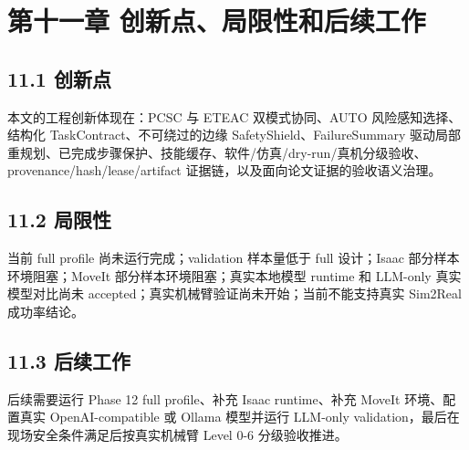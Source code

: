 \chapter{第十一章 创新点、局限性和后续工作}

\section{11.1 创新点}

本文的工程创新体现在：PCSC 与 ETEAC 双模式协同、AUTO 风险感知选择、结构化 TaskContract、不可绕过的边缘 SafetyShield、FailureSummary 驱动局部重规划、已完成步骤保护、技能缓存、软件/仿真/dry-run/真机分级验收、provenance/hash/lease/artifact 证据链，以及面向论文证据的验收语义治理。\par

\section{11.2 局限性}

当前 full profile 尚未运行完成；validation 样本量低于 full 设计；Isaac 部分样本环境阻塞；MoveIt 部分样本环境阻塞；真实本地模型 runtime 和 LLM-only 真实模型对比尚未 accepted；真实机械臂验证尚未开始；当前不能支持真实 Sim2Real 成功率结论。\par

\section{11.3 后续工作}

后续需要运行 Phase 12 full profile、补充 Isaac runtime、补充 MoveIt 环境、配置真实 OpenAI-compatible 或 Ollama 模型并运行 LLM-only validation，最后在现场安全条件满足后按真实机械臂 Level 0-6 分级验收推进。\par
